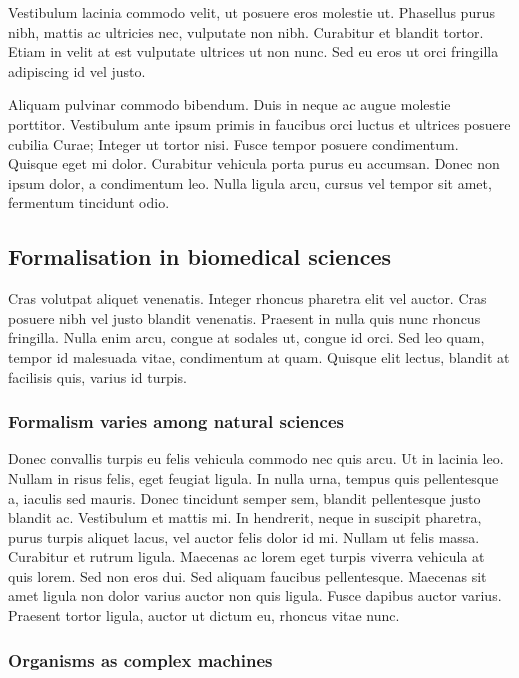 Vestibulum lacinia commodo velit, ut posuere eros molestie ut. Phasellus purus nibh, mattis ac ultricies nec, vulputate non nibh. Curabitur et blandit tortor. Etiam in velit at est vulputate ultrices ut non nunc. Sed eu eros ut orci fringilla adipiscing id vel justo.

Aliquam pulvinar commodo bibendum. Duis in neque ac augue molestie porttitor. Vestibulum ante ipsum primis in faucibus orci luctus et ultrices posuere cubilia Curae; Integer ut tortor nisi. Fusce tempor posuere condimentum. Quisque eget mi dolor. Curabitur vehicula porta purus eu accumsan. Donec non ipsum dolor, a condimentum leo. Nulla ligula arcu, cursus vel tempor sit amet, fermentum tincidunt odio.

\subsection{Formalisation in biomedical sciences}

Cras volutpat aliquet venenatis. Integer rhoncus pharetra elit vel auctor. Cras posuere nibh vel justo blandit venenatis. Praesent in nulla quis nunc rhoncus fringilla. Nulla enim arcu, congue at sodales ut, congue id orci. Sed leo quam, tempor id malesuada vitae, condimentum at quam. Quisque elit lectus, blandit at facilisis quis, varius id turpis.

\subsubsection{Formalism varies among natural sciences}

Donec convallis turpis eu felis vehicula commodo nec quis arcu. Ut in lacinia leo. Nullam in risus felis, eget feugiat ligula. In nulla urna, tempus quis pellentesque a, iaculis sed mauris. Donec tincidunt semper sem, blandit pellentesque justo blandit ac. Vestibulum et mattis mi. In hendrerit, neque in suscipit pharetra, purus turpis aliquet lacus, vel auctor felis dolor id mi. Nullam ut felis massa. Curabitur et rutrum ligula. Maecenas ac lorem eget turpis viverra vehicula at quis lorem. Sed non eros dui. Sed aliquam faucibus pellentesque. Maecenas sit amet ligula non dolor varius auctor non quis ligula. Fusce dapibus auctor varius. Praesent tortor ligula, auctor ut dictum eu, rhoncus vitae nunc.

\subsubsection{Organisms as complex machines}

